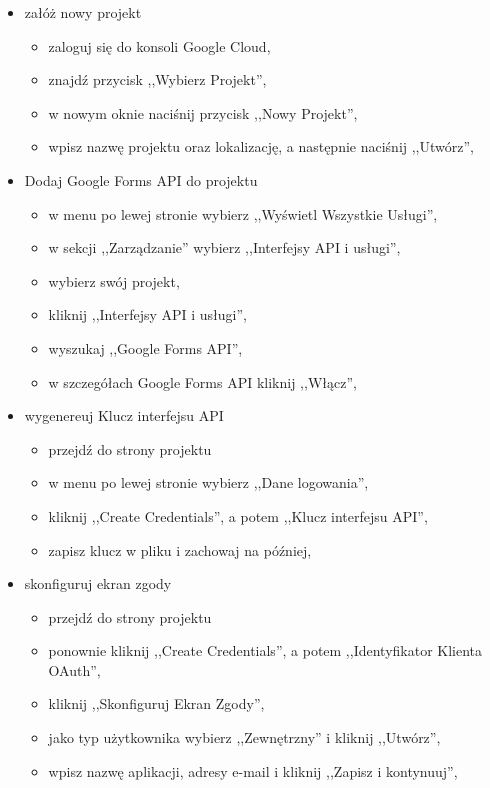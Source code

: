 \begin{itemize}
  \item załóż nowy projekt
    \begin{itemize}
      \item zaloguj się do konsoli Google Cloud,
      \item znajdź przycisk ,,Wybierz Projekt'',
      \item w nowym oknie naciśnij przycisk ,,Nowy Projekt'',
      \item wpisz nazwę projektu oraz lokalizację, a następnie naciśnij ,,Utwórz'',
    \end{itemize}
  \item  Dodaj Google Forms API do projektu
    \begin{itemize}
      \item w menu po lewej stronie wybierz ,,Wyświetl Wszystkie Usługi'',
      \item w sekcji ,,Zarządzanie'' wybierz ,,Interfejsy API i usługi'',
      \item wybierz swój projekt,
      \item kliknij ,,Interfejsy API i usługi'',
      \item wyszukaj ,,Google Forms API'',
      \item w szczegółach Google Forms API kliknij ,,Włącz'',
    \end{itemize}
  \item wygenereuj Klucz interfejsu API
    \begin{itemize}
      \item przejdź do strony projektu
      \item w menu po lewej stronie wybierz ,,Dane logowania'',
      \item kliknij ,,Create Credentials'', a potem ,,Klucz interfejsu API'',
      \item zapisz klucz w pliku i zachowaj na później,
    \end{itemize}
  \item skonfiguruj ekran zgody
    \begin{itemize}
      \item przejdź do strony projektu
      \item ponownie kliknij ,,Create Credentials'', a potem 
            ,,Identyfikator Klienta OAuth'',
      \item kliknij ,,Skonfiguruj Ekran Zgody'',
      \item jako typ użytkownika wybierz ,,Zewnętrzny'' i kliknij ,,Utwórz'',
      \item wpisz nazwę aplikacji, adresy e-mail i kliknij ,,Zapisz i kontynuuj'',

\end{itemize}
\end{itemize}

